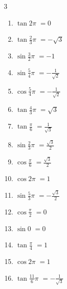\begin{multicols}{3}
\begin{enumerate}
  \item $\displaystyle \tan{2\pi}$
        $\displaystyle =0$

  \item $\displaystyle \tan{\frac{2}{3}\pi}$
        $\displaystyle =-\sqrt{3}$

  \item $\displaystyle \sin{\frac{3}{2}\pi}$
        $\displaystyle =-1$

  \item $\displaystyle \sin{\frac{5}{4}\pi}$
        $\displaystyle =-\frac{1}{\sqrt{2}}$

  \item $\displaystyle \cos{\frac{5}{4}\pi}$
        $\displaystyle =-\frac{1}{\sqrt{2}}$

  \item $\displaystyle \tan{\frac{4}{3}\pi}$
        $\displaystyle =\sqrt{3}$

  \item $\displaystyle \tan{\frac{\pi}{6}}$
        $\displaystyle =\frac{1}{\sqrt{3}}$

  \item $\displaystyle \sin{\frac{2}{3}\pi}$
        $\displaystyle =\frac{\sqrt{3}}{2}$

  \item $\displaystyle \cos{\frac{\pi}{6}}$
        $\displaystyle =\frac{\sqrt{3}}{2}$

  \item $\displaystyle \cos{2\pi}$
        $\displaystyle =1$

  \item $\displaystyle \sin{\frac{5}{3}\pi}$
        $\displaystyle =-\frac{\sqrt{3}}{2}$

  \item $\displaystyle \cos{\frac{\pi}{2}}$
        $\displaystyle =0$

  \item $\displaystyle \sin{0}$
        $\displaystyle =0$

\columnbreak %

  \item $\displaystyle \tan{\frac{\pi}{4}}$
        $\displaystyle =1$

  \item $\displaystyle \cos{2\pi}$
        $\displaystyle =1$

  \item $\displaystyle \tan{\frac{11}{6}\pi}$
        $\displaystyle =-\frac{1}{\sqrt{3}}$


\end{enumerate}
\end{multicols}
